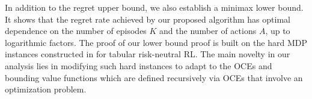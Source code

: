 \documentclass[11pt]{article}
\newcommand{\1}{\mathbbm{1}}
\begin{document}
In addition to the regret upper bound, we also establish a minimax lower bound. It shows that the regret rate achieved by our proposed algorithm has optimal dependence on the number of episodes $K$ and the number of actions $A$, up to logarithmic factors. The proof of our lower bound proof is built on the hard MDP instances constructed in \cite{domingues2021episodic} for tabular risk-neutral RL. The main novelty in our analysis lies in modifying such hard instances to adapt to the OCEs and bounding value functions which are defined recursively via OCEs that involve an optimization problem. 











\end{document}
